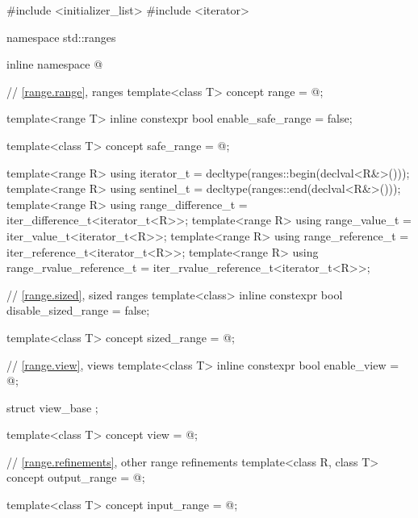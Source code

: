 %
\begin{codeblock}
#include <initializer_list>
#include <iterator>

namespace std::ranges {
  inline namespace @

  // \ref{range.range}, ranges
  template<class T>
    concept range = @\seebelow@;

  template<range T>
    inline constexpr bool enable_safe_range = false;

  template<class T>
    concept safe_range = @\seebelow@;

  template<range R>
    using iterator_t = decltype(ranges::begin(declval<R&>()));
  template<range R>
    using sentinel_t = decltype(ranges::end(declval<R&>()));
  template<range R>
    using range_difference_t = iter_difference_t<iterator_t<R>>;
  template<range R>
    using range_value_t = iter_value_t<iterator_t<R>>;
  template<range R>
    using range_reference_t = iter_reference_t<iterator_t<R>>;
  template<range R>
    using range_rvalue_reference_t = iter_rvalue_reference_t<iterator_t<R>>;

  // \ref{range.sized}, sized ranges
  template<class>
    inline constexpr bool disable_sized_range = false;

  template<class T>
    concept sized_range = @\seebelow@;

  // \ref{range.view}, views
  template<class T>
    inline constexpr bool enable_view = @\seebelow@;

  struct view_base { };

  template<class T>
    concept view = @\seebelow@;

  // \ref{range.refinements}, other range refinements
  template<class R, class T>
    concept output_range = @\seebelow@;

  template<class T>
    concept input_range = @\seebelow@;

}
\end{codeblock}
